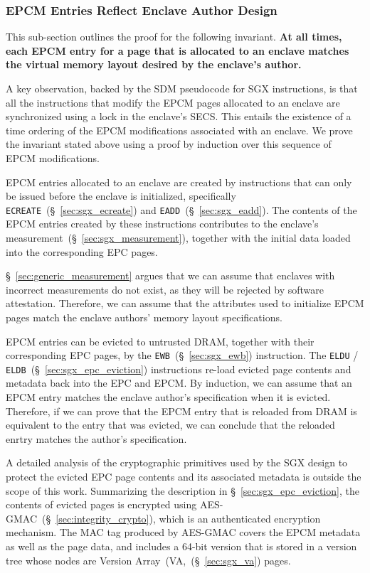 \subsubsection{EPCM Entries Reflect Enclave Author Design}

This sub-section outlines the proof for the following invariant. \textbf{At
all times, each EPCM entry for a page that is allocated to an enclave matches
the virtual memory layout desired by the enclave's author.}

A key observation, backed by the SDM pseudocode for SGX instructions, is that
all the instructions that modify the EPCM pages allocated to an enclave are
synchronized using a lock in the enclave's SECS. This entails the existence of
a time ordering of the EPCM modifications associated with an enclave. We prove
the invariant stated above using a proof by induction over this sequence of
EPCM modifications.

EPCM entries allocated to an enclave are created by instructions that can only
be issued before the enclave is initialized, specifically
\texttt{ECREATE}~(\S~\ref{sec:sgx_ecreate}) and
\texttt{EADD}~(\S~\ref{sec:sgx_eadd}). The contents of the EPCM entries created
by these instructions contributes to the enclave's
measurement~(\S~\ref{sec:sgx_measurement}), together with the initial data
loaded into the corresponding EPC pages.

\S~\ref{sec:generic_measurement} argues that we can assume that enclaves with
incorrect measurements do not exist, as they will be rejected by software
attestation. Therefore, we can assume that the attributes used to initialize
EPCM pages match the enclave authors' memory layout specifications.

EPCM entries can be evicted to untrusted DRAM, together with their
corresponding EPC pages, by the \texttt{EWB}~(\S~\ref{sec:sgx_ewb})
instruction.  The \texttt{ELDU} / \texttt{ELDB}~(\S~\ref{sec:sgx_epc_eviction})
instructions re-load evicted page contents and metadata back into the EPC and
EPCM. By induction, we can assume that an EPCM entry matches the enclave
author's specification when it is evicted. Therefore, if we can prove that the
EPCM entry that is reloaded from DRAM is equivalent to the entry that was
evicted, we can conclude that the reloaded enrtry matches the author's
specification.

A detailed analysis of the cryptographic primitives used by the SGX design to
protect the evicted EPC page contents and its associated metadata is outside
the scope of this work. Summarizing the description in
\S~\ref{sec:sgx_epc_eviction}, the contents of evicted pages is encrypted using
AES-GMAC~(\S~\ref{sec:integrity_crypto}), which is an authenticated encryption
mechanism. The MAC tag produced by AES-GMAC covers the EPCM metadata as well as
the page data, and includes a 64-bit version that is stored in a version tree
whose nodes are Version Array~(VA,~(\S~\ref{sec:sgx_va}) pages.

